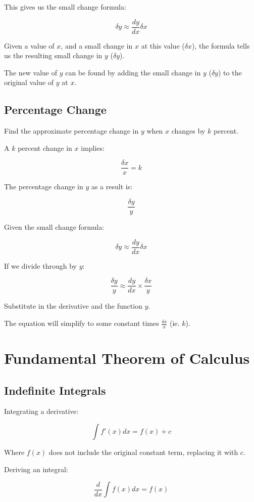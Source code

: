 \documentclass[a4paper,11pt]{article}
\begin{document}
This gives us the small change formula:

$$
\delta y \approx \frac{dy}{dx} \delta x
$$

Given a value of $x$, and a small change in $x$ at this value ($\delta x$), the
formula tells us the resulting small change in $y$ ($\delta y$).

The new value of $y$ can be found by adding the small change in $y$
($\delta y$) to the original value of $y$ at $x$.


\subsection{Percentage Change}

Find the approximate percentage change in $y$ when $x$ changes by $k$ percent.

A $k$ percent change in $x$ implies:

$$
\frac{\delta x}{x} = k
$$

The percentage change in $y$ as a result is:

$$
\frac{\delta y}{y}
$$

Given the small change formula:

$$
\delta y \approx \frac{dy}{dx} \delta x
$$

If we divide through by $y$:

$$
\frac{\delta y}{y} \approx \frac{dy}{dx} \times \frac{\delta x}{y}
$$

Substitute in the derivative and the function $y$.

The equation will simplify to some constant times $\frac{\delta x}{x}$
(ie. $k$).



\section{Fundamental Theorem of Calculus}

\subsection{Indefinite Integrals}

Integrating a derivative:

$$
\int f'(x) dx = f(x) + c
$$

Where $f(x)$ does not include the original constant term, replacing it with $c$.

Deriving an integral:

$$
\frac{d}{dx} \int f(x) dx = f(x)
$$
\end{document}

